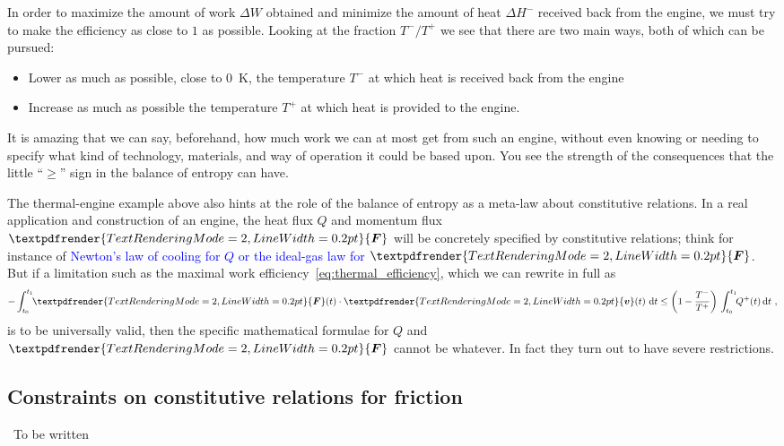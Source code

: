 \documentclass[a4paper,12pt,%
onecolumn,oneside,%
british%
]{memoir}
\renewcommand*{\bm}[1]{\textpdfrender{TextRenderingMode=2,LineWidth=0.2pt}{\boldsymbol{#1}}}
\newcommand{\mynotew}[1]{{\footnotesize\color{midgrey}\faIcon{tools}\ #1}}
\newcommand*{\di}{\mathrm{d}}%
\newcommand*{\incr}{\Delta}%
\renewcommand*{\|}[1][]{\nonscript\:#1\vert\nonscript\:\mathopen{}}
\newcommand*{\sect}{\S}%
\renewcommand*{\autoref}[2]{\sidepar{\vspace{-1ex}\footnotesize{\color{blue}\faIcon{%
angle-right%
}\enskip\sect~\ref{#1} page~\pageref{#1}}}\textcolor{blue}{#2}}
\newcommand*{\yv}{\bm{v}}
\newcommand*{\yti}{t_{0}}
\newcommand*{\ytf}{t_{1}}
\newcommand*{\yQ}{Q}%
\newcommand*{\yQp}{Q^{+}}%
\newcommand*{\yhem}{\incr H^{-}}%
\newcommand*{\yW}{\incr W}%
\newcommand*{\yF}{\bm{F}}
\newcommand*{\yT}{T}%
\newcommand*{\yTp}{\yT^{+}}%
\newcommand*{\yTm}{\yT^{-}}%
\begin{document}
In order to maximize the amount of work $\yW$ obtained and minimize the amount of heat $\yhem$ received back from the engine, we must try to make the efficiency as close to $1$ as possible. Looking at the fraction $\yTm/\yTp$ we see that there are two main ways, both of which can be pursued:
\begin{itemize}
\item Lower as much as possible, close to \qty{0}{K}, the temperature $\yTm$ at which heat is received back from the engine
\item Increase as much as possible the temperature $\yTp$ at which heat is provided to the engine.
\end{itemize}

\medskip

It is amazing that we can say, beforehand, how much work we can at most get from such an engine, without even knowing or needing to specify what kind of technology, materials, and way of operation it could be based upon. You see the strength of the consequences that the little \enquote{$\ge$} sign in the balance of entropy can have.

The thermal-engine example above also hints at the role of the balance of entropy as a meta-law about constitutive relations. In a real application and construction of an engine, the heat flux $\yQ$ and momentum flux $\yF$ will be concretely specified by constitutive relations; think for instance of \autoref{sec:int_energy_idealgas}{Newton's law of cooling for $\yQ$ or the ideal-gas law for $\yF$}. But if a limitation such as the maximal work efficiency~\eqref{eq:thermal_efficiency}, which we can rewrite in full as
\begin{equation*}
  -\int_{\yti}^{\ytf}\!\!\yF(t)\cdot\yv(t)\ \di t
  \le
  \biggl(1-\frac{\yTm}{\yTp}\biggr)\,
  \int_{\yti}^{\ytf}\!\!\yQp(t)\,\di t \ ,
\end{equation*}
is to be universally valid, then the specific mathematical formulae for $\yQ$ and $\yF$ cannot be whatever. In fact they turn out to have severe restrictions.


\subsection{Constraints on constitutive relations for friction}
\label{sec:friction_entropy}
\mynotew{To be written}



\end{document}
